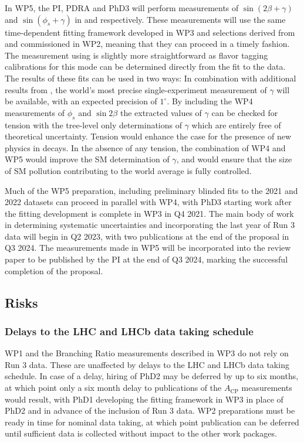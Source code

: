 \documentclass[11pt,a4paper]{article}
\begin{document}
 In WP5, the PI, PDRA and PhD3 will perform measurements of $\sin(2\beta + \gamma)$ and $\sin(\phi_s + \gamma)$ in \HepProcess{\PBzero\to\PD\Ppi}  and \HepProcess{\PBs\to\PDs\PK} respectively. These measurements will use the same time-dependent fitting framework developed in WP3 and selections derived from and commissioned in WP2, meaning that they can proceed in a timely fashion. The measurement using \HepProcess{\PBzero\to\PD\Ppi} is slightly more straightforward as flavor tagging calibrations for this mode can be determined directly from the fit to the data. The results of these fits can be used in two ways: In combination with additional results from \LHCb, the world's most precise single-experiment measurement of $\gamma$ will be available, with an expected precision of $1^{\circ}$. By including the WP4 measurements of $\phi_s$ and $\sin 2\beta$ the extracted values of $\gamma$ can be checked for tension with the tree-level only determinations of $\gamma$ which are entirely free of theoretical uncertainty. Tension would enhance the case for the presence of new physics in \HepProcess{\PB\to\PD\PD} decays. In the absence of any tension, the combination of WP4 and WP5 would improve the SM determination of $\gamma$, and would ensure that the size of SM pollution contributing to the world average is fully controlled.
 
 Much of the WP5 preparation, including preliminary blinded fits to the 2021 and 2022 datasets can proceed in parallel with WP4, with PhD3 starting work after the fitting development is complete in WP3 in Q4 2021. The main body of work in determining systematic uncertainties and incorporating the last year of Run 3 data will begin in Q2 2023, with two publications at the end of the proposal in Q3 2024. 
 The measurements made in WP5 will be incorporated into the review paper to be published by the PI at the end of Q3 2024, marking the successful completion of the proposal.   

\subsection{Risks} 

\subsubsection{Delays to the LHC and LHCb data taking schedule}
WP1 and the Branching Ratio measurements described in WP3 do not rely on Run 3 data. These are unaffected by delays to the LHC and LHCb data taking schedule. In case of a delay, hiring of PhD2 may be deferred by up to six months, at which point only a six month delay to publications of the $A_{\text{CP}}$ measurements would result, with PhD1 developing the fitting framework in WP3 in place of PhD2 and in advance of the inclusion of Run 3 data. WP2 preparations must be ready in time for nominal data taking, at which point publication can be deferred until sufficient data is collected without impact to the other work packages. 
\end{document}
